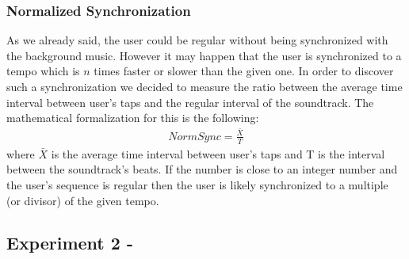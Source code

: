 \subsubsection*{Normalized Synchronization}
As we already said, the user could be regular without being synchronized with the background music. However it may happen that the user is synchronized to a tempo which is $n$ times faster or slower than the given one.
In order to discover such a synchronization we decided to measure the ratio between the average time interval between user's taps and the regular interval of the soundtrack. The mathematical formalization for this is the following:
\begin{align}
	NormSync = \frac{\bar{X}}{T}
\end{align}
where $\bar{X}$ is the average time interval between user's taps and T is the interval between the soundtrack's beats.
If the number is close to an integer number and the user's sequence is regular then the user is likely synchronized to a multiple (or divisor) of the given tempo.

\subsection{Experiment 2 - \testsecond}